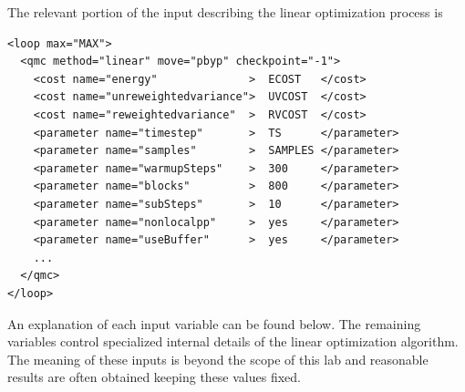The relevant portion of the input describing the linear optimization process is
\begin{lstlisting}
<loop max="MAX">
  <qmc method="linear" move="pbyp" checkpoint="-1">
    <cost name="energy"              >  ECOST   </cost>
    <cost name="unreweightedvariance">  UVCOST  </cost>
    <cost name="reweightedvariance"  >  RVCOST  </cost>
    <parameter name="timestep"       >  TS      </parameter>
    <parameter name="samples"        >  SAMPLES </parameter>
    <parameter name="warmupSteps"    >  300     </parameter>
    <parameter name="blocks"         >  800     </parameter>
    <parameter name="subSteps"       >  10      </parameter>
    <parameter name="nonlocalpp"     >  yes     </parameter>
    <parameter name="useBuffer"      >  yes     </parameter>
    ...
  </qmc>
</loop>
\end{lstlisting}
\noindent
An explanation of each input variable can be found below.  The remaining variables control specialized internal details of the linear optimization algorithm.  The meaning of these inputs is beyond the scope of this lab and reasonable results are often obtained keeping these values fixed. 
